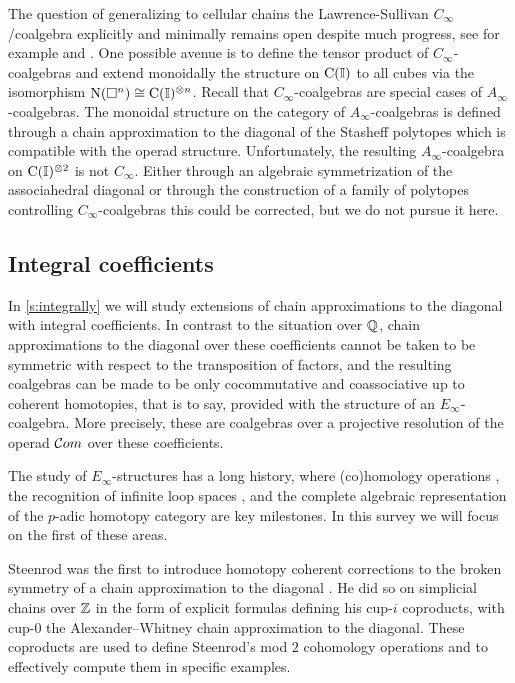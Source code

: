 The question of generalizing to cellular chains the Lawrence-Sullivan $C_\infty$\-/coalgebra explicitly and minimally remains open despite much progress, see for example
\cite{lawrence2019triangle, lawrence2021cells} and \cite[\S6.5]{buijs2020liemodels}.
One possible avenue is to define the tensor product of $C_\infty$-coalgebras and extend monoidally the structure on $\operatorname{C}(\mathbb{I})$ to all cubes via the isomorphism $\operatorname{N}(\square^n) \cong \operatorname{C}(\mathbb{I})^{\otimes n}$.
Recall that $C_\infty$-coalgebras are special cases of $A_\infty$-coalgebras.
The monoidal structure on the category of $A_\infty$-coalgebras is defined through a chain approximation to the diagonal of the Stasheff polytopes which is compatible with the operad structure.
Unfortunately, the resulting $A_\infty$-coalgebra on $\operatorname{C}(\mathbb{I})^{\otimes 2}$ is not $C_\infty$.
Either through an algebraic symmetrization of the associahedral diagonal or through the construction of a family of polytopes controlling $C_\infty$-coalgebras this could be corrected, but we do not pursue it here.

\subsection*{Integral coefficients}

In \cref{s:integrally} we will study extensions of chain approximations to the diagonal with integral coefficients.
In contrast to the situation over $\mathbb{Q}$, chain approximations to the diagonal over these coefficients cannot be taken to be symmetric with respect to the transposition of factors, and the resulting coalgebras can be made to be only cocommutative and coassociative up to coherent homotopies, that is to say, provided with the structure of an $E_\infty$-coalgebra.
More precisely, these are coalgebras over a projective resolution of the operad $\mathcal{C}om$ over these coefficients.

The study of $E_\infty$-structures has a long history, where (co)homology operations \cite{steenrod1962cohomology, may1970general}, the recognition of infinite loop spaces \cite{boardman1973homotopy, may1972geometry}, and the complete algebraic representation of the $p$-adic homotopy category \cite{mandell2001padic} are key milestones.
In this survey we will focus on the first of these areas.

Steenrod was the first to introduce homotopy coherent corrections to the broken symmetry of a chain approximation to the diagonal \cite{steenrod1947products}.
He did so on simplicial chains over $\mathbb{Z}$ in the form of explicit formulas defining his cup-$i$ coproducts, with \mbox{cup-$0$} the Alexander--Whitney chain approximation to the diagonal.
These coproducts are used to define Steenrod's mod $2$ cohomology operations and to effectively compute them in specific examples.

